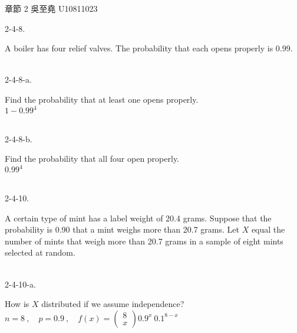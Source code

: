 \documentclass[12pt]{book}
\author{andersonwu2000}
\begin{document}
\begin{CJK}{UTF8}{bsmi}

\hfill 章節 2 吳至堯 U10811023


2-4-8. \begin{minipage}[t]{\dimexpr\linewidth-2em}
A boiler has four relief valves. The probability that each opens properly is 0.99.
\end{minipage}\\

2-4-8-a. \begin{minipage}[t]{\dimexpr\linewidth-2em}
Find the probability that at least one opens properly. \\
$1-0.99^4$
\end{minipage}\\

2-4-8-b. \begin{minipage}[t]{\dimexpr\linewidth-2em}
Find the probability that all four open properly. \\
$0.99^4$
\end{minipage}\\

2-4-10. \begin{minipage}[t]{\dimexpr\linewidth-2em}
A certain type of mint has a label weight of 20.4 grams. Suppose that the probability is 0.90 that a mint weighs more than 20.7 grams. Let $X$ equal the number of mints that weigh more than 20.7 grams in a sample of eight mints selected at random.
\end{minipage}\\

2-4-10-a. \begin{minipage}[t]{\dimexpr\linewidth-2em}
How is $X$ distributed if we assume independence? \\
$n=8\ ,\quad p=0.9\ ,\quad f(x)=\left(\begin{matrix}
8\\x
\end{matrix}\right)0.9^x\ 0.1^{8-x}$
\end{minipage}\\


\end{CJK}
\end{document}
